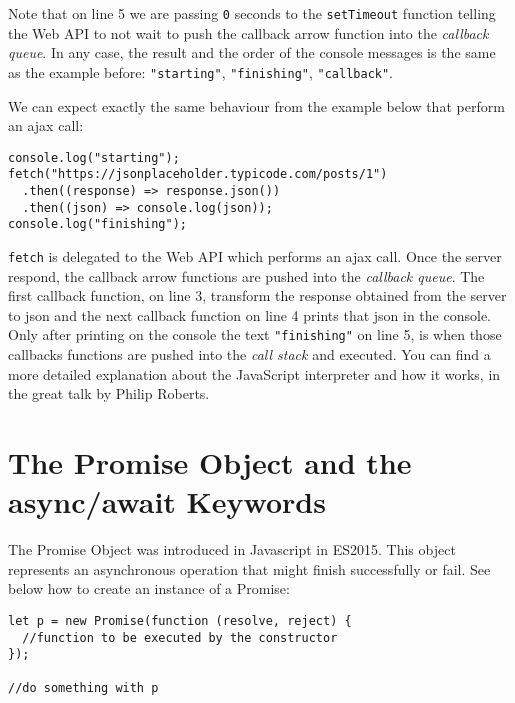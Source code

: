 \documentclass[a4paper, oneside, titlepage, 12pt]{book}
\begin{document}
Note that on line 5 we are passing \texttt{0} seconds to the \texttt{setTimeout} function telling the Web API to not wait to push the callback arrow function into the \textit{callback queue}. In any case, the result and the order of the console messages is the same as the example before: \texttt{"starting"}, \texttt{"finishing"}, \texttt{"callback"}.

We can expect exactly the same behaviour from the example below that perform an ajax call:

\begin{verbatim}
console.log("starting");
fetch("https://jsonplaceholder.typicode.com/posts/1")
  .then((response) => response.json())
  .then((json) => console.log(json));
console.log("finishing");
\end{verbatim}

\texttt{fetch} is delegated to the Web API which performs an ajax call. Once the server respond, the callback arrow functions are pushed into the \textit{callback queue}. The first callback function, on line 3, transform the response obtained from the server to json and the next callback function on line 4 prints that json in the console. Only after printing on the console the text \texttt{"finishing"} on line 5, is when those callbacks functions are pushed into the \textit{call stack} and executed. You can find a more detailed explanation about the JavaScript interpreter and how it works, in the great talk by Philip Roberts\cite{loupe}.

\section{The Promise Object and the async/await Keywords}

The Promise Object was introduced in Javascript in ES2015. This object represents an asynchronous operation that might finish successfully or fail. See below how to create an instance of a Promise:

\begin{verbatim}
let p = new Promise(function (resolve, reject) {
  //function to be executed by the constructor
});

//do something with p
\end{verbatim}
\end{document}
